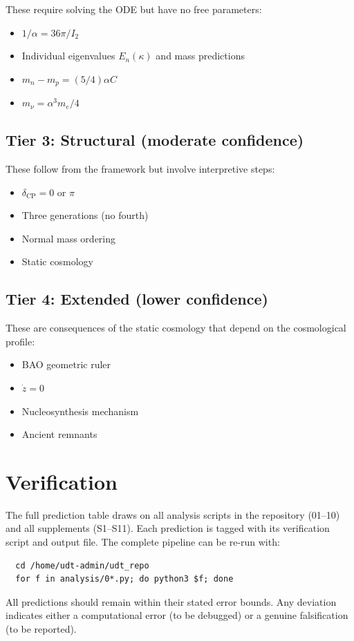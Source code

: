 \documentclass[11pt,letterpaper]{article}
\numberwithin{equation}{section}
\begin{document}
These require solving the ODE but have no free parameters:
\begin{itemize}
  \item $1/\alpha = 36\pi/I_2$
  \item Individual eigenvalues $E_n(\kappa)$ and mass predictions
  \item $m_n - m_p = (5/4)\alpha C$
  \item $m_\nu = \alpha^3 m_e/4$
\end{itemize}

\subsection{Tier 3: Structural (moderate confidence)}

These follow from the framework but involve interpretive steps:
\begin{itemize}
  \item $\delta_\mathrm{CP} = 0$ or $\pi$
  \item Three generations (no fourth)
  \item Normal mass ordering
  \item Static cosmology
\end{itemize}

\subsection{Tier 4: Extended (lower confidence)}

These are consequences of the static cosmology that depend on the
cosmological profile:
\begin{itemize}
  \item BAO geometric ruler
  \item $\dot{z} = 0$
  \item Nucleosynthesis mechanism
  \item Ancient remnants
\end{itemize}

\section{Verification}
\label{sec:verification}

The full prediction table draws on all analysis scripts in the repository
(01--10) and all supplements (S1--S11). Each prediction is tagged with its
verification script and output file. The complete pipeline can be re-run
with:
\begin{verbatim}
  cd /home/udt-admin/udt_repo
  for f in analysis/0*.py; do python3 $f; done
\end{verbatim}

All predictions should remain within their stated error bounds. Any
deviation indicates either a computational error (to be debugged) or a
genuine falsification (to be reported).
\end{document}
